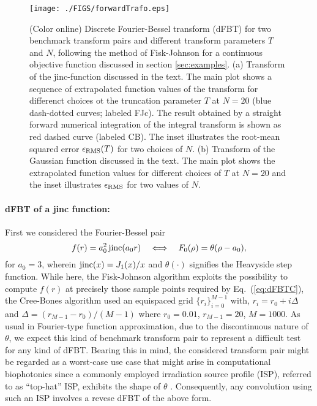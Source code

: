 \documentclass[12pt]{iopart}
\begin{document}
%
%
\begin{figure}[t!]
\centerline{\texttt{[image: ./FIGS/forwardTrafo.eps]} } 
\caption{(Color online)  Discrete Fourier-Bessel transform (dFBT) for two 
benchmark transform pairs and different transform parameters $T$ and $N$,
following the method of Fisk-Johnson for a continuous objective function
discussed in section \ref{sec:examples}.
(a) Transform of the {\rm jinc}-function discussed in the text. The main
plot shows a sequence of extrapolated function values of the transform for
differenct choices ot the truncation parameter $T$ at $N=20$ (blue dash-dotted
curves; labeled FJc). The result obtained by a straight forward numerical
integration of the integral transform is shown as red dashed curve (labeled
CB).  The inset illustrates the root-mean squared error $\epsilon_{\rm RMS}(T)$
for two choices of $N$. 
(b) Transform of the Gaussian function discussed in the text. The main
plot shows the extrapolated function values for different choices of $T$ at
$N=20$ and the inset illustrates $\epsilon_{\rm RMS}$ for two values of $N$.}
\label{fig:examples}
\end{figure}

\paragraph{dFBT of a {\rm jinc} function:}
First we considered the Fourier-Bessel pair
\begin{equation}
f(r) = a_0^2 \,{\rm jinc}(a_0 r) \quad \Longleftrightarrow \quad 
F_0(\rho) = \theta(\rho-a_0),
\label{eq:FBP1}
\end{equation}
for $a_0=3$, wherein ${\rm jinc}(x)=J_1(x)/x$ and $\theta(\cdot)$ signifies the
Heavyside step function.  While here, the Fisk-Johnson algorithm exploits the
possibility to compute $f(r)$ at precisely those sample points required by
Eq.~(\ref{eq:dFBTC}), the Cree-Bones algorithm used an equispaced grid
$\{r_i\}_{i=0}^{M-1}$ with, $r_i=r_0+i\Delta$ and
$\Delta=(r_{M-1}-r_{0})/(M-1)$ where $r_0 = 0.01$, $r_{M-1}=20$, $M=1000$.  As
usual in Fourier-type function approximation, due to the discontinuous nature
of $\theta$, we expect this kind of benchmark transform pair to represent a
difficult test for any kind of dFBT.  Bearing this in mind, the considered
transform pair might be regarded as a worst-case use case that might arise in
computational biophotonics since a commonly employed irradiation source profile
(ISP), referred to as ``top-hat'' ISP, exhibits the shape of $\theta$
\cite{Paltauf:2000,CONV:1997}.  Consequently, any convolution using such an ISP
involves a revese dFBT of the above form.
\end{document}
